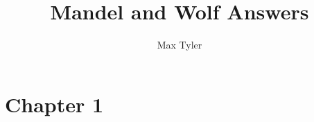 \documentclass{report}
\title{Mandel and Wolf Answers}
\author{Max Tyler}
\begin{document}
\maketitle
\tableofcontents

\section{Chapter 1}

\end{document}
